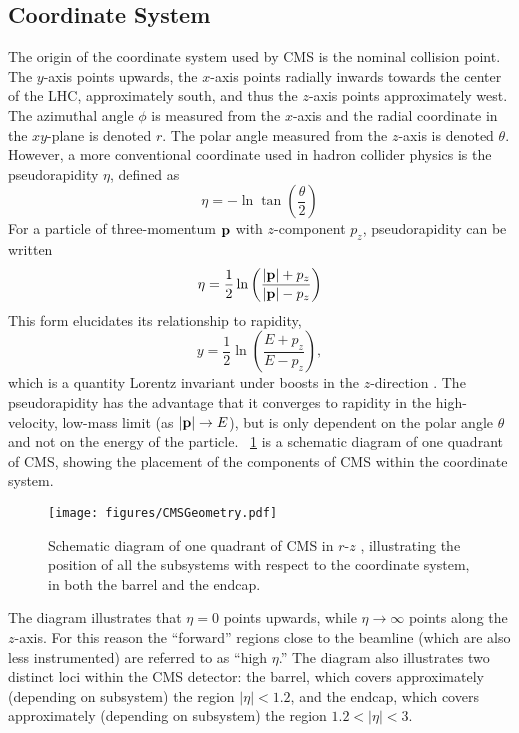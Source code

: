 \subsection{Coordinate System}
The origin of the coordinate system used by CMS is the nominal \pp collision point.
The $y$-axis points upwards, the $x$-axis points radially inwards towards the center of the LHC, approximately south, and thus the $z$-axis points approximately west.
The azimuthal angle $\phi$ is measured from the $x$-axis and the radial coordinate in the $xy$-plane is denoted $r$.
The polar angle measured from the $z$-axis is denoted $\theta$.
However, a more conventional coordinate used in hadron collider physics is the pseudorapidity $\eta$, defined as
\begin{equation}
  \eta = -\ln\tan\left(\frac{\theta}{2}\right)
  \label{eq:eta}
\end{equation}
For a particle of three-momentum $\mathbf{p}$ with $z$-component $p_z$, pseudorapidity can be written
\begin{equation}
  \eta = \frac12\ln\left(\frac{|\mathbf{p}|+p_z}{|\mathbf{p}|-p_z}\right)
  \label{eq:eta_p}
\end{equation}
This form elucidates its relationship to rapidity,
\begin{equation}
  y = \frac12\ln\left(\frac{E+p_z}{E-p_z}\right),
  \label{eq:rap}
\end{equation}
which is a quantity Lorentz invariant under boosts in the $z$-direction \cite{Hama:1981}.
The pseudorapidity has the advantage that it converges to rapidity in the high-velocity, low-mass limit (as $|\mathbf{p}|\to E$), but is only dependent on the polar angle $\theta$ and not on the energy of the particle.
\Fig~\ref{cms:quadrant} is a schematic diagram of one quadrant of CMS, showing the placement of the components of CMS within the coordinate system.
\begin{figure}[tpb]
  \centering
  \texttt{[image: figures/CMSGeometry.pdf]}
  \caption{Schematic diagram of one quadrant of CMS in $r$-$z$ \cite{Sirunyan:2018fpa}, illustrating the position of all the subsystems with respect to the coordinate system, in both the barrel and the endcap.}
  \label{cms:quadrant}
\end{figure}

The diagram illustrates that $\eta = 0$ points upwards, while $\eta \to \infty$ points along the $z$-axis.
For this reason the ``forward'' regions close to the beamline (which are also less instrumented) are referred to as ``high $\eta$.''
The diagram also illustrates two distinct loci within the CMS detector: the barrel, which covers approximately (depending on subsystem) the region $|\eta| < 1.2$, and the endcap, which covers approximately (depending on subsystem) the region $1.2 < |\eta| < 3$.

